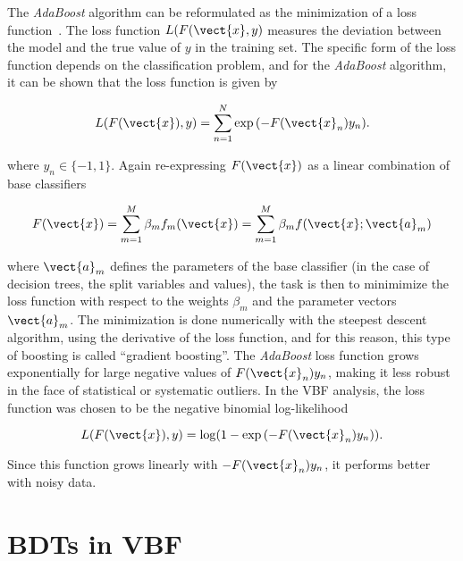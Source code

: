 
The \textit{AdaBoost} algorithm can be reformulated as the
minimization of a loss function~\cite{bib:friedman2000greedy}. The loss function
$L(F(\vect{x},y)$ measures the deviation between the model and the
true value of $y$ in the training set. The specific form of the loss
function depends on the classification problem, and for the \textit{AdaBoost}
algorithm, it can be shown that the loss function is given by

\begin{equation}
\label{chap:bdt:equation:adaboost_loss}
    L(F(\vect{x}),y) = \sum_{n=1}^{N}\exp{(-F(\vect{x}_n)y_n)}.
\end{equation}

\noindent where $y_n \in \{-1,1\}$. Again re-expressing $F(\vect{x})$
as a linear combination of base classifiers

\begin{equation}
\label{chap:bdt:equation:adaboost_loss}
    F(\vect{x}) = \sum_{m=1}^{M} \beta_m f_m(\vect{x}) =
    \sum_{m=1}^{M} \beta_m f(\vect{x};\vect{a}_m)
\end{equation}

\noindent where $\vect{a}_m$ defines the parameters of the base
classifier (in the case of decision trees, the split variables and
values), the task is then to minimimize the loss function with respect
to the weights $\beta_m$ and the parameter vectors $\vect{a}_m$. The
minimization is done numerically with the steepest descent algorithm,
using the derivative of the loss function, and for this reason, this
type of boosting is called ``gradient boosting''. The
\textit{AdaBoost} loss function grows exponentially for large negative
values of $F(\vect{x}_n)y_n$, making it less robust in the face of
statistical or systematic outliers. In the VBF analysis, the loss
function was chosen to be the negative binomial log-likelihood

\begin{equation}
\label{chap:bdt:equation:vbf_loss}
    L(F(\vect{x}),y) = \log (1-\exp{(-F(\vect{x}_n)y_n)}).
\end{equation}

\noindent Since this function grows linearly with $-F(\vect{x}_n)y_n$, it performs
better with noisy data. 

\section{BDTs in VBF \hwwlnln}

